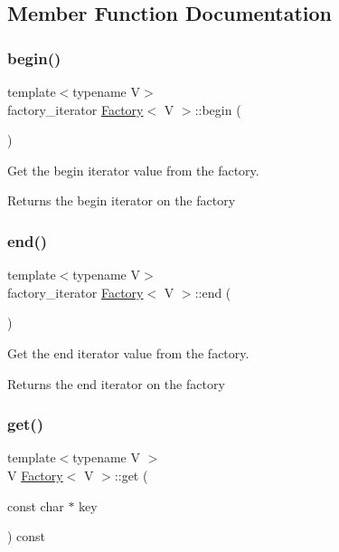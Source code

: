 \subsection{Member Function Documentation}
\mbox{\label{classFactory_a3ea08050cb96078e9d9624de4220d517}} 
\subsubsection{\texorpdfstring{begin()}{begin()}}
{\footnotesize\ttfamily template$<$typename V$>$ \\
factory\+\_\+iterator \mbox{\hyperlink{classFactory}{Factory}}$<$ V $>$\+::begin (\begin{DoxyParamCaption}{ }\end{DoxyParamCaption})\hspace{0.3cm}{\ttfamily [inline]}}

Get the begin iterator value from the factory.

\begin{DoxyReturn}{Returns}
the begin iterator on the factory 
\end{DoxyReturn}
\mbox{\label{classFactory_a8b583450f222b426ba2212365f49638f}} 
\subsubsection{\texorpdfstring{end()}{end()}}
{\footnotesize\ttfamily template$<$typename V$>$ \\
factory\+\_\+iterator \mbox{\hyperlink{classFactory}{Factory}}$<$ V $>$\+::end (\begin{DoxyParamCaption}{ }\end{DoxyParamCaption})\hspace{0.3cm}{\ttfamily [inline]}}

Get the end iterator value from the factory.

\begin{DoxyReturn}{Returns}
the end iterator on the factory 
\end{DoxyReturn}
\mbox{\label{classFactory_a8a13e5edc3e0c102a1e2fb85047e99d8}} 
\subsubsection{\texorpdfstring{get()}{get()}}
{\footnotesize\ttfamily template$<$typename V $>$ \\
V \mbox{\hyperlink{classFactory}{Factory}}$<$ V $>$\+::get (\begin{DoxyParamCaption}\item[{const char $\ast$}]{key }\end{DoxyParamCaption}) const}

